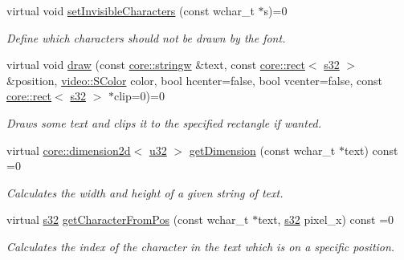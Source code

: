 \begin{DoxyCompactItemize}
virtual void \hyperlink{classirr_1_1gui_1_1IGUIFont_acff05412dc954845add611c5f71cef49}{set\+Invisible\+Characters} (const wchar\+\_\+t $\ast$s)=0
\begin{DoxyCompactList}\small\item\em Define which characters should not be drawn by the font. \end{DoxyCompactList}\item 
virtual void \hyperlink{classirr_1_1gui_1_1IGUIFont_af5627e546c474f31260fe671c24f9a33}{draw} (const \hyperlink{namespaceirr_1_1core_a5aedb62cb47cf01d1c548ab5e6344d2d}{core\+::stringw} \&text, const \hyperlink{classirr_1_1core_1_1rect}{core\+::rect}$<$ \hyperlink{namespaceirr_ac66849b7a6ed16e30ebede579f9b47c6}{s32} $>$ \&position, \hyperlink{classirr_1_1video_1_1SColor}{video\+::\+S\+Color} color, bool hcenter=false, bool vcenter=false, const \hyperlink{classirr_1_1core_1_1rect}{core\+::rect}$<$ \hyperlink{namespaceirr_ac66849b7a6ed16e30ebede579f9b47c6}{s32} $>$ $\ast$clip=0)=0
\begin{DoxyCompactList}\small\item\em Draws some text and clips it to the specified rectangle if wanted. \end{DoxyCompactList}\item 
virtual \hyperlink{classirr_1_1core_1_1dimension2d}{core\+::dimension2d}$<$ \hyperlink{namespaceirr_a0416a53257075833e7002efd0a18e804}{u32} $>$ \hyperlink{classirr_1_1gui_1_1IGUIFont_aa7612db0c9dc2837b44a1a2fa5668797}{get\+Dimension} (const wchar\+\_\+t $\ast$text) const =0
\begin{DoxyCompactList}\small\item\em Calculates the width and height of a given string of text. \end{DoxyCompactList}\item 
virtual \hyperlink{namespaceirr_ac66849b7a6ed16e30ebede579f9b47c6}{s32} \hyperlink{classirr_1_1gui_1_1IGUIFont_a60d4d0465deedd811cd0fecd11b4329f}{get\+Character\+From\+Pos} (const wchar\+\_\+t $\ast$text, \hyperlink{namespaceirr_ac66849b7a6ed16e30ebede579f9b47c6}{s32} pixel\+\_\+x) const =0
\begin{DoxyCompactList}\small\item\em Calculates the index of the character in the text which is on a specific position. \end{DoxyCompactList}\item 
\mbox{\label{classirr_1_1gui_1_1IGUIFont_a3d5a42997a718b510b73e7d6235b993e}} 

\end{DoxyCompactItemize}
